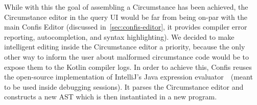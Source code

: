 While with this the goal of assembling a Circumstance has been achieved, the Circumstance editor in the query UI would be far from being on-par with the main Confis Editor (discussed in~\autoref{sec:confis-editor}, it provides compiler error reporting, autocompletion, and syntax highlighting).
We decided to make intelligent editing inside the Circumstance editor a priority, because the only other way to inform the user about malformed circumstance code would be to expose them to the Kotlin compiler logs.
In order to achieve this, Confis reuses the open-source implementation of IntelliJ's Java expression evaluator~\cite{intelliJRepo}~(meant to be used inside debugging sessions).
It parses the Circumstance editor and constructs a new AST which is then instantiated in a new program.


